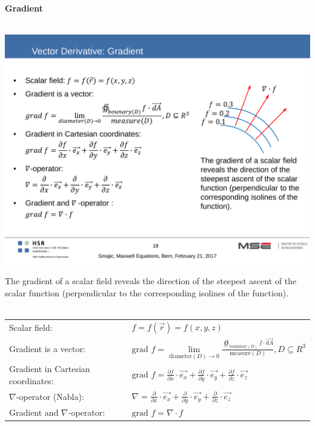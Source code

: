 \textbf{\\ \\ Gradient\\ \\}
\begin{minipage}[lt]{5cm}
	\includegraphics[width=.8\textwidth]{./images/Gradient.pdf}
\end{minipage}
\begin{minipage}[rt]{13cm}
	The gradient of a scalar field reveals the direction of the steepest ascent of the scalar function (perpendicular to the corresponding isolines of the function). \\ \\
	\begin{tabular}{ll}
		Scalar field: & \(\displaystyle f = f\left(\vec{r}\right) = f\left(x,y,z\right) \) \\ 
		Gradient is a vector: & \(\displaystyle \textrm{grad }f = \lim\limits_{\textrm{diameter}\left(D\right)\rightarrow 0} \frac{\oiint_{\textrm{boundary}\left(D\right)}f \cdot \vec{dA}}{\textrm{measure}\left(D\right)}, D\subseteq R^3 \) \\
		Gradient in Cartesian coordinates: & \(\displaystyle \textrm{grad }f = \frac{\partial f}{\partial x} \cdot \vec{e_x}+\frac{\partial f}{\partial y} \cdot \vec{e_y}+\frac{\partial f}{\partial z} \cdot \vec{e_z} \) \\ 
		$\nabla$-operator (Nabla): & \(\displaystyle \nabla = \frac{\partial}{\partial x} \cdot \vec{e_x}+\frac{\partial}{\partial y} \cdot \vec{e_y}+\frac{\partial}{\partial z} \cdot \vec{e_z} \)\\
		Gradient and $\nabla$-operator: & \(\displaystyle \textrm{grad }f = \nabla \cdot f \)\\
	\end{tabular} 
\end{minipage}

